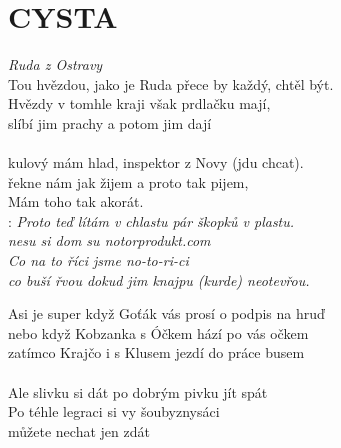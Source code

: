 \section*{\Huge CYSTA}
\emph{Ruda z Ostravy}\\

Tou hvězdou, jako je Ruda přece by každý, chtěl být.\\
Hvězdy v tomhle kraji však prdlačku mají,\\
slíbí jim prachy a potom jim dají\\
\\
kulový mám hlad, inspektor z Novy (jdu chcat).\\
řekne nám jak žijem a proto tak pijem,\\
Mám toho tak akorát.\\

\textregistered:
\emph{
Proto teď lítám v chlastu pár škopků v plastu.\\
nesu si dom su notorprodukt.com\\
Co na to říci jsme no-to-ri-ci\\
co buší řvou dokud jim knajpu (kurde) neotevřou.\\
}

Asi je super když Goťák vás prosí o podpis na hruď\\
nebo když Kobzanka s Óčkem hází po vás očkem\\
zatímco Krajčo i s Klusem jezdí do práce busem\\
\\
Ale slivku si dát po dobrým pivku jít spát\\
Po téhle legraci si vy šoubyznysáci\\
můžete nechat jen zdát

\textregistered \textregistered

\newpage
